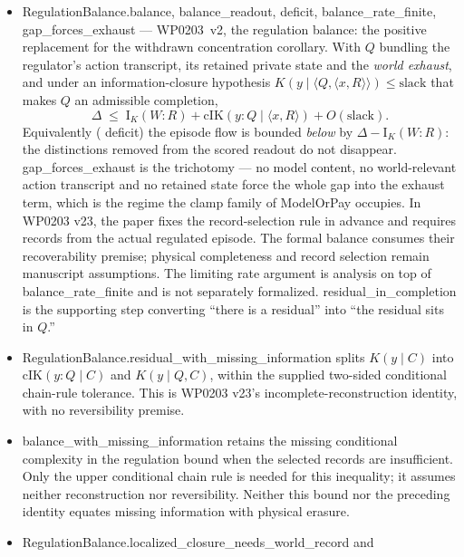 \documentclass[11pt,a4paper]{article}
\newcommand{\lean}[1]{{\ttfamily\small
  \let\leanunderscore\_\def\_{\leanunderscore\allowbreak}#1}}
\newcommand{\Ik}{\mathrm{I}_K}
\begin{document}
\begin{itemize}[leftmargin=1.4em,itemsep=1pt]
$\Ik(W{:}R)=\Ik(y_\varnothing{:}R)+\Ik(W{:}R\mid y_\varnothing)\pm3\,\mathrm{slack}$ from three
named chain facts. These are the four displays of WP0203 v34.3's Discussion subsection on
intervention knowledge and descriptive power, previously paper-level.
\item \lean{RegulationBalance.balance}, \lean{balance\_readout}, \lean{deficit},
\lean{balance\_rate\_finite}, \lean{gap\_forces\_exhaust} --- WP0203~v2, the regulation balance:
the positive replacement for the withdrawn concentration corollary. With $Q$ bundling the regulator's action transcript, its
retained private state and the \emph{world exhaust}, and under an information-closure hypothesis
$K(y\mid\langle Q,\langle x,R\rangle\rangle)\le\mathrm{slack}$ that makes $Q$ an admissible
completion,
\[
  \Delta\;\le\;\Ik(W{:}R)+\mathrm{cIK}(y{:}Q\mid\langle x,R\rangle)+O(\mathrm{slack}).
\]
Equivalently (\lean{deficit}) the episode flow is bounded \emph{below} by
$\Delta-\Ik(W{:}R)$: the distinctions removed from the scored readout do not disappear.
\lean{gap\_forces\_exhaust} is the trichotomy --- no model content, no world-relevant action
transcript and no retained state force the whole gap into the exhaust term, which is the regime
the clamp family of \lean{ModelOrPay} occupies. In WP0203 v23, the paper fixes the
record-selection rule in advance and requires records from the actual regulated episode.
The formal balance consumes their recoverability premise; physical completeness and record
selection remain manuscript assumptions. The limiting rate argument is analysis on top of
\lean{balance\_rate\_finite} and is not separately formalized.
\lean{residual\_in\_completion} is the supporting step converting ``there is a residual'' into
``the residual sits in $Q$.''
\item \lean{RegulationBalance.residual\_with\_missing\_information} splits
$K(y\mid C)$ into $\mathrm{cIK}(y{:}Q\mid C)$ and $K(y\mid Q,C)$,
within the supplied two-sided conditional chain-rule tolerance. This is
WP0203 v23's incomplete-reconstruction identity, with no reversibility premise.
\item \lean{balance\_with\_missing\_information} retains the missing conditional
complexity in the regulation bound when the selected records are insufficient.
Only the upper conditional chain rule is needed for this inequality; it assumes
neither reconstruction nor reversibility. Neither this bound nor the preceding
identity equates missing information with physical erasure.
\item \lean{RegulationBalance.localized\_closure\_needs\_world\_record} and

\end{itemize}
\end{document}
